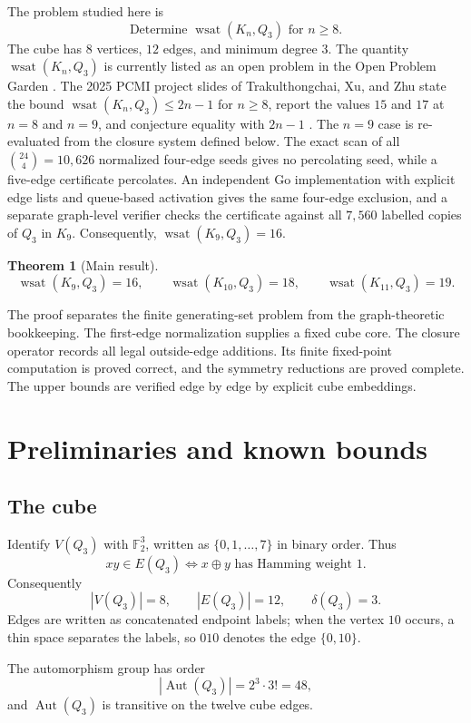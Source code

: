 \documentclass[11pt]{article}
\numberwithin{equation}{section}
\newtheorem{theorem}{Theorem}[section]
\newcommand{\wsat}{\operatorname{wsat}}
\newcommand{\Aut}{\operatorname{Aut}}
\begin{document}
The problem studied here is
\[
\boxed{\text{Determine }\wsat(K_n,Q_3)\text{ for }n\ge 8.}
\]
The cube has $8$ vertices, $12$ edges, and minimum degree $3$. The quantity $\wsat(K_n,Q_3)$ is currently listed as an open problem in the Open Problem Garden \cite{OPG}. The 2025 PCMI project slides of Trakulthongchai, Xu, and Zhu state the bound $\wsat(K_n,Q_3)\le 2n-1$ for $n\ge8$, report the values $15$ and $17$ at $n=8$ and $n=9$, and conjecture equality with $2n-1$ \cite{PCMI2025}. The $n=9$ case is re-evaluated from the closure system defined below. The exact scan of all $\binom{24}{4}=10,626$ normalized four-edge seeds gives no percolating seed, while a five-edge certificate percolates. An independent Go implementation with explicit edge lists and queue-based activation gives the same four-edge exclusion, and a separate graph-level verifier checks the certificate against all $7,560$ labelled copies of $Q_3$ in $K_9$. Consequently, $\wsat(K_9,Q_3)=16$.

\begin{theorem}[Main result]\label{thm:main}
\[
\boxed{\wsat(K_9,Q_3)=16,\qquad \wsat(K_{10},Q_3)=18,\qquad \wsat(K_{11},Q_3)=19.}
\]
\end{theorem}

The proof separates the finite generating-set problem from the graph-theoretic bookkeeping. The first-edge normalization supplies a fixed cube core. The closure operator records all legal outside-edge additions. Its finite fixed-point computation is proved correct, and the symmetry reductions are proved complete. The upper bounds are verified edge by edge by explicit cube embeddings.

\section{Preliminaries and known bounds}\label{sec:prelim}

\subsection{The cube}
Identify $V(Q_3)$ with $\mathbb F_2^3$, written as $\{0,1,\ldots,7\}$ in binary order. Thus
\[
xy\in E(Q_3)\iff x\oplus y\text{ has Hamming weight }1.
\]
Consequently
\[
|V(Q_3)|=8,\qquad |E(Q_3)|=12,\qquad \delta(Q_3)=3.
\]
Edges are written as concatenated endpoint labels; when the vertex $10$ occurs, a thin space separates the labels, so $0\!10$ denotes the edge $\{0,10\}$.

The automorphism group has order
\[
|\Aut(Q_3)|=2^3\cdot 3!=48,
\]
and $\Aut(Q_3)$ is transitive on the twelve cube edges.
\end{document}
